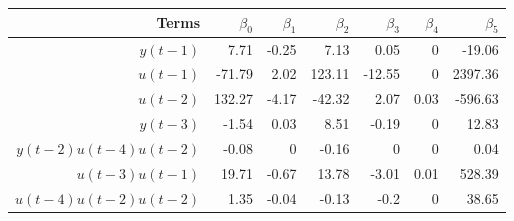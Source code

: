 \begin{tabular}{rrrrrrr}
Terms & $\beta_0$ & $\beta_1$ & $\beta_2$ & $\beta_3$ & $\beta_4$ & $\beta_5$ \\ 
\hline 
$y(t-1)$ & 7.71 & -0.25 & 7.13 & 0.05 & 0 & -19.06 \\ 
$u(t-1)$ & -71.79 & 2.02 & 123.11 & -12.55 & 0 & 2397.36 \\ 
$u(t-2)$ & 132.27 & -4.17 & -42.32 & 2.07 & 0.03 & -596.63 \\ 
$y(t-3)$ & -1.54 & 0.03 & 8.51 & -0.19 & 0 & 12.83 \\ 
$y(t-2)u(t-4)u(t-2)$ & -0.08 & 0 & -0.16 & 0 & 0 & 0.04 \\ 
$u(t-3)u(t-1)$ & 19.71 & -0.67 & 13.78 & -3.01 & 0.01 & 528.39 \\ 
$u(t-4)u(t-2)u(t-2)$ & 1.35 & -0.04 & -0.13 & -0.2 & 0 & 38.65 \\ 
\hline 
\end{tabular}